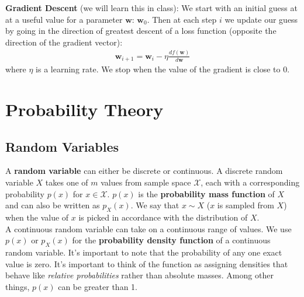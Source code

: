 \documentclass{harvardml}
\theoremstyle{definition}
\theoremstyle{plain}
\newcommand{\mcX}{\mathcal{X}}
\renewcommand{\v}[1]{\mathbf{#1}}
\begin{document}
            \noindent \textbf{Gradient Descent} (we will learn this in class): We start with an initial 
			guess at at a useful value for a parameter $\v w$: 
			$\mathbf{w}_0$. Then at each step $i$ we update our guess 
			by going in the direction of greatest descent of a loss 
			function (opposite the direction of the gradient vector):
                  \begin{align*}
                      \mathbf{w}_{i+1} = \mathbf{w}_i - \eta 
					  \frac{d f(\mathbf{w})}{d \mathbf{w}}
                  \end{align*}
        	where $\eta$ is a learning rate. We stop when the value of 
			the gradient is close to 0. \\

    
\section{Probability Theory}
    \subsection{Random Variables}
		A \textbf{random variable} can either be discrete or continuous. 
		A discrete random variable $X$ takes one of $m$ values from sample 
		space $\mcX$, each with a corresponding probability $p(x)$ for 
		$x\in \mcX$. $p(x)$ is the \textbf{probability mass function} of 
		$X$ and can also be written as $p_X(x)$. We say that $x \sim X$ 
		($x$ is sampled from $X$) when the value of $x$ is picked in 
		accordance with the distribution of $X$.\\

		\noindent A continuous random variable can take on a continuous 
		range of values. We use $p(x)$ or $p_X(x)$ for the 
		\textbf{probability density function} of a continuous random 
		variable. It's important to note that the probability of any one 
		exact value is zero. It's important to think of the function as
        assigning densities that behave like \textit{relative probabilities} 
		rather than absolute masses. Among other things, $p(x)$ can be 
		greater than 1.
\end{document}
